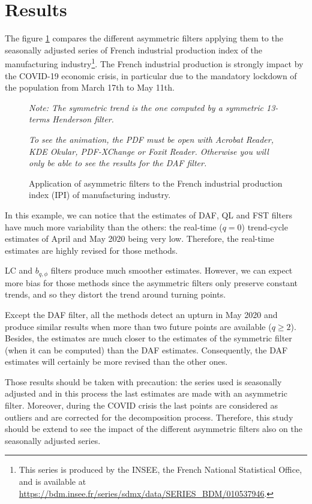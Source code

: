 \documentclass[12pt,,a4paper]{article}
\begin{document}
\hypertarget{results}{%
\section{Results}\label{results}}

The figure \ref{fig:ipi} compares the different asymmetric filters applying them to the seasonally adjusted series of French industrial production index of the manufacturing industry\footnote{This series is produced by the INSEE, the French National Statistical Office, and is available at \url{https://bdm.insee.fr/series/sdmx/data/SERIES_BDM/010537946}.}.
The French industrial production is strongly impact by the COVID-19 economic crisis, in particular due to the mandatory lockdown of the population from March 17th to May 11th.

\begin{figure}[!ht]
\caption{Application of asymmetric filters to the French industrial production index (IPI) of manufacturing industry.}\label{fig:ipi}\footnotesize
\emph{Note: The symmetric trend is the one computed by a symmetric 13-terms Henderson filter.}

\emph{To see the animation, the PDF must be open with Acrobat Reader, KDE Okular, PDF-XChange or Foxit Reader.
Otherwise you will only be able to see the results for the DAF filter.}
\end{figure}

In this example, we can notice that the estimates of DAF, QL and FST filters have much more variability than the others: the real-time (\(q=0\)) trend-cycle estimates of April and May 2020 being very low.
Therefore, the real-time estimates are highly revised for those methods.

LC and \(b_{q,\phi}\) filters produce much smoother estimates.
However, we can expect more bias for those methods since the asymmetric filters only preserve constant trends, and so they distort the trend around turning points.

Except the DAF filter, all the methods detect an upturn in May 2020 and produce similar results when more than two future points are available (\(q\geq 2\)).
Besides, the estimates are much closer to the estimates of the symmetric filter (when it can be computed) than the DAF estimates.
Consequently, the DAF estimates will certainly be more revised than the other ones.

Those results should be taken with precaution: the series used is seasonally adjusted and in this process the last estimates are made with an asymmetric filter.
Moreover, during the COVID crisis the last points are considered as outliers and are corrected for the decomposition process.
Therefore, this study should be extend to see the impact of the different asymmetric filters also on the seasonally adjusted series.
\end{document}
